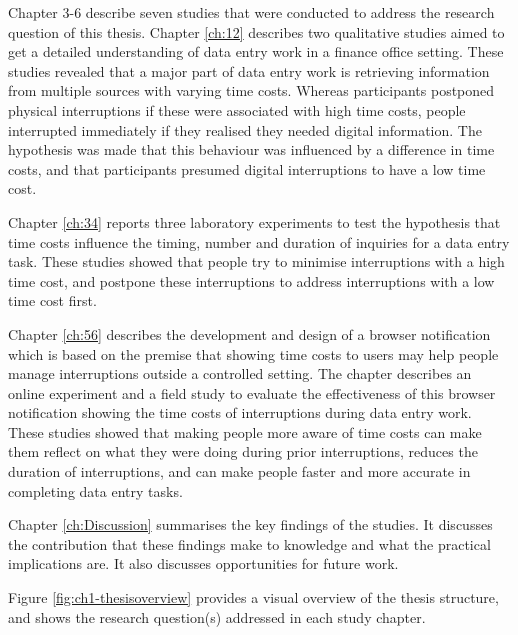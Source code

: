 Chapter 3-6 describe seven studies that were conducted to address the research question of this thesis. Chapter \ref{ch:12} describes two qualitative studies aimed to get a detailed understanding of data entry work in a finance office setting. These studies revealed that a major part of data entry work is retrieving information from multiple sources with varying time costs. Whereas participants postponed physical interruptions if these were associated with high time costs, people interrupted immediately if they realised they needed digital information. The hypothesis was made that this behaviour was influenced by a difference in time costs, and that participants presumed digital interruptions to have a low time cost. 

Chapter \ref{ch:34} reports three laboratory experiments to test the hypothesis that time costs influence the timing, number and duration of inquiries for a data entry task. These studies showed that people try to minimise interruptions with a high time cost, and postpone these interruptions to address interruptions with a low time cost first. %

Chapter \ref{ch:56} describes the development and design of a browser notification which is based on the premise that showing time costs to users may help people manage interruptions outside a controlled setting. The chapter describes an online experiment and a field study to evaluate the effectiveness of this browser notification showing the time costs of interruptions during data entry work. These studies showed that making people more aware of time costs can make them reflect on what they were doing during prior interruptions, reduces the duration of interruptions, and can make people faster and more accurate in completing data entry tasks.

Chapter \ref{ch:Discussion} summarises the key findings of the studies. It discusses the contribution that these findings make to knowledge and what the practical implications are. It also discusses opportunities for future work. 

Figure \ref{fig:ch1-thesisoverview} provides a visual overview of the thesis structure, and shows the research question(s) addressed in each study chapter.

